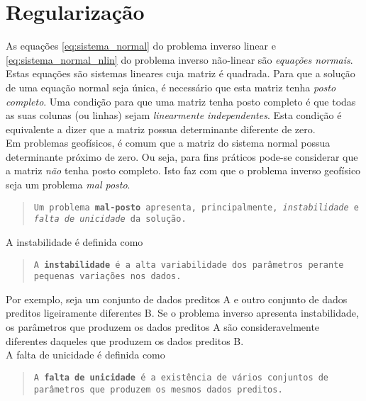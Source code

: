 \chapter{Regularização}

As equações \ref{eq:sistema_normal} do problema inverso linear e
\ref{eq:sistema_normal_nlin} do problema inverso não-linear são
{\it equações normais}.
Estas equações são sistemas lineares cuja matriz é quadrada.
Para que a solução de uma equação normal seja única, é necessário que esta
matriz tenha {\it posto completo}.
Uma condição para que uma matriz tenha posto completo é que todas as suas colunas
(ou linhas) sejam {\it linearmente independentes}.
Esta condição é equivalente a dizer que a matriz possua determinante diferente de
zero.
\\
\indent Em problemas geofísicos, é comum que a matriz do sistema normal possua
determinante próximo de zero. Ou seja, para fins práticos pode-se considerar que
a matriz {\it não} tenha posto completo.
Isto faz com que o problema inverso geofísico seja um problema {\it mal posto}.

\begin{quote}
{\tt Um problema {\bf mal-posto} apresenta, principalmente, {\it instabilidade}
e {\it falta de unicidade} da solução.}
\end{quote}

\indent A instabilidade é definida como

\begin{quote}
{\tt A {\bf instabilidade} é a alta variabilidade dos parâmetros perante
peque\-nas variações nos dados.}
\end{quote}

\noindent Por exemplo, seja um conjunto de dados preditos A e outro conjunto de
dados preditos ligeiramente diferentes B.
Se o problema inverso apresenta instabilidade, os pa\-râ\-me\-tros que produzem os
dados preditos A são consideravelmente diferentes daqueles que produzem os dados
preditos B.
\\
\indent A falta de unicidade é definida como

\begin{quote}
{\tt A {\bf falta de unicidade} é a existência de vários conjuntos de parâme\-tros
que produzem os mesmos dados preditos.}
\end{quote}

